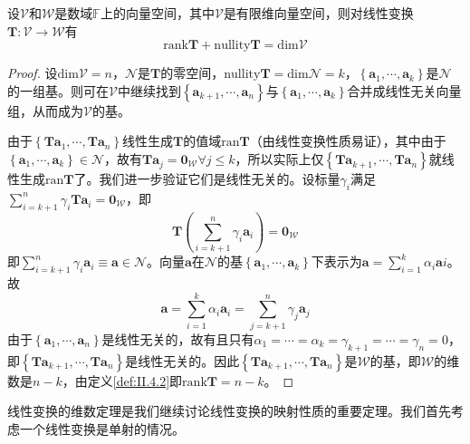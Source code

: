 \documentclass[main.tex]{subfiles}
\begin{document}
\begin{theorem}\label{thm:II.4.3}
设$\mathcal{V}$和$\mathcal{W}$是数域$\mathbb{F}$上的向量空间，其中$\mathcal{V}$是有限维向量空间，则对线性变换$\mathbf{T}:\mathcal{V}\rightarrow\mathcal{W}$有
\[
\mathrm{rank}\mathbf{T}+\mathrm{nullity}\mathbf{T}=\mathrm{dim}\mathcal{V}
\]
\end{theorem}
\begin{proof}
设$\mathrm{dim}\mathcal{V}=n$，$\mathcal{N}$是$\mathbf{T}$的零空间，$\mathrm{nullity}\mathbf{T}=\mathrm{dim}\mathcal{N}=k$，$\left\{\mathbf{a}_1,\cdots,\mathbf{a}_k\right\}$是$\mathcal{N}$的一组基。则可在$\mathcal{V}$中继续找到$\left\{\mathbf{a}_{k+1},\cdots,\mathbf{a}_{n}\right\}$与$\left\{\mathbf{a}_1,\cdots,\mathbf{a}_k\right\}$合并成线性无关向量组，从而成为$\mathcal{V}$的基。

由于$\left\{\mathbf{Ta}_1,\cdots,\mathbf{Ta}_n\right\}$线性生成$\mathbf{T}$的值域$\mathrm{ran}\mathbf{T}$（由线性变换性质易证），其中由于$\left\{\mathbf{a}_1,\cdots,\mathbf{a}_k\right\}\in\mathcal{N}$，故有$\mathbf{Ta}_j=\mathbf{0}_\mathcal{W}\forall j\leq k$，所以实际上仅$\left\{\mathbf{Ta}_{k+1},\cdots,\mathbf{Ta}_n\right\}$就线性生成$\mathrm{ran}\mathbf{T}$了。我们进一步验证它们是线性无关的。设标量$\gamma_i$满足$\sum_{i=k+1}^n\gamma_i\mathbf{Ta}_i=\mathbf{0}_\mathcal{W}$，即
\[\mathbf{T}\left(\sum_{i=k+1}^n\gamma_i\mathbf{a}_i\right)=\mathbf{0}_\mathcal{W}\]
即$\sum_{i=k+1}^n\gamma_i\mathbf{a}_i\equiv\mathbf{a}\in\mathcal{N}$。向量$\mathbf{a}$在$\mathcal{N}$的基$\left\{\mathbf{a}_1,\cdots,\mathbf{a}_k\right\}$下表示为$\mathbf{a}=\sum_{i=1}^k\alpha_i\mathbf{a}i$。故
\[
\mathbf{a}=\sum_{i=1}^k\alpha_i\mathbf{a}_i=\sum_{j=k+1}^n\gamma_j\mathbf{a}_j
\]
由于$\left\{\mathbf{a}_1,\cdots,\mathbf{a}_n\right\}$是线性无关的，故有且只有$\alpha_1=\cdots=\alpha_k=\gamma_{k+1}=\cdots=\gamma_n=0$，即$\left\{\mathbf{Ta}_{k+1},\cdots,\mathbf{Ta}_n\right\}$是线性无关的。因此$\left\{\mathbf{Ta}_{k+1},\cdots,\mathbf{Ta}_n\right\}$是$\mathcal{W}$的基，即$\mathcal{W}$的维数是$n-k$，由定义\ref{def:II.4.2}即$\mathrm{rank}\mathbf{T}=n-k$。
\end{proof}

线性变换的维数定理是我们继续讨论线性变换的映射性质的重要定理。我们首先考虑一个线性变换是单射的情况。
\end{document}
